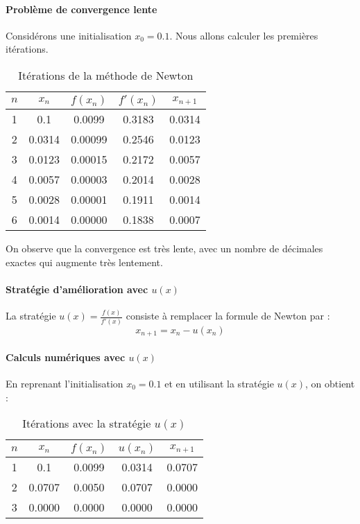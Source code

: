 \documentclass{article}
\begin{document}
\paragraph{Problème de convergence lente}
Considérons une initialisation \( x_0 = 0.1 \). Nous allons calculer les premières itérations.

\begin{table}[h!]
\centering
\begin{tabular}{|c|c|c|c|c|}
\hline
$n$ & $x_n$ & $f(x_n)$ & $f'(x_n)$ & $x_{n+1}$ \\
\hline
1 & 0.1 & 0.0099 & 0.3183 & 0.0314 \\
2 & 0.0314 & 0.00099 & 0.2546 & 0.0123 \\
3 & 0.0123 & 0.00015 & 0.2172 & 0.0057 \\
4 & 0.0057 & 0.00003 & 0.2014 & 0.0028 \\
5 & 0.0028 & 0.00001 & 0.1911 & 0.0014 \\
6 & 0.0014 & 0.00000 & 0.1838 & 0.0007 \\
\hline
\end{tabular}
\caption{Itérations de la méthode de Newton}
\end{table}

On observe que la convergence est très lente, avec un nombre de décimales exactes qui augmente très lentement.

\paragraph{Stratégie d'amélioration avec \( u(x) \)}
La stratégie \( u(x) = \frac{f(x)}{f'(x)} \) consiste à remplacer la formule de Newton par :
\[
x_{n+1} = x_n - u(x_n)
\]

\paragraph{Calculs numériques avec \( u(x) \)}
En reprenant l'initialisation \( x_0 = 0.1 \) et en utilisant la stratégie \( u(x) \), on obtient :

\begin{table}[h!]
\centering
\begin{tabular}{|c|c|c|c|c|}
\hline
$n$ & $x_n$ & $f(x_n)$ & $u(x_n)$ & $x_{n+1}$ \\
\hline
1 & 0.1 & 0.0099 & 0.0314 & 0.0707 \\
2 & 0.0707 & 0.0050 & 0.0707 & 0.0000 \\
3 & 0.0000 & 0.0000 & 0.0000 & 0.0000 \\
\hline
\end{tabular}
\caption{Itérations avec la stratégie \( u(x) \)}
\end{table}
\end{document}
